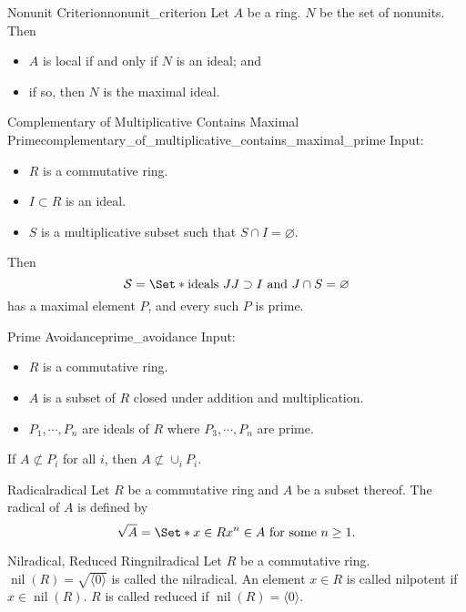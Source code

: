 \documentclass{article}
\begin{document}
\begin{lemma}{Nonunit Criterion}{nonunit_criterion}
    Let $A$ be a ring.
    $N$ be the set of nonunits.
    Then
    \begin{itemize}
        \item $A$ is local if and only if $N$ is an ideal; and
        \item if so, then $N$ is the maximal ideal.
    \end{itemize}
\end{lemma}

\begin{proposition}{Complementary of Multiplicative Contains Maximal Prime}{complementary_of_multiplicative_contains_maximal_prime}
    Input:
    \begin{itemize}
        \item $R$ is a commutative ring.
        \item $I\subset R$ is an ideal.
        \item $S$ is a multiplicative subset such that $S\cap I = \varnothing$.
    \end{itemize}
    Then
    \[ \mathcal{S} = \Set*{\text{ideals } J}{J\supset I \text{ and } J\cap S = \varnothing} \]
    has a maximal element $P$, and every such $P$ is prime.
\end{proposition}

\begin{lemma}{Prime Avoidance}{prime_avoidance}
    Input:
    \begin{itemize}
        \item $R$ is a commutative ring.
        \item $A$ is a subset of $R$ closed under addition and multiplication.
        \item $P_1,\cdots,P_n$ are ideals of $R$ where $P_3,\cdots,P_n$ are prime.
    \end{itemize}
    If $A\not\subset P_i$ for all $i$, then $A\not\subset \cup_i P_i$.
\end{lemma}

\begin{definition}{Radical}{radical}
    Let $R$ be a commutative ring and $A$ be a subset thereof.
    The radical of $A$ is defined by
    \[ \sqrt{A} = \Set*{x\in R}{x^n\in A \text{ for some } n\ge 1}. \]
\end{definition}

\begin{definition}{Nilradical, Reduced Ring}{nilradical}
    Let $R$ be a commutative ring.
    $\operatorname{nil}(R) = \sqrt{\langle 0 \rangle}$ is called the nilradical.
    An element $x\in R$ is called nilpotent if $x\in \operatorname{nil}(R)$.
    $R$ is called reduced if $\operatorname{nil}(R) = \langle 0 \rangle$.
\end{definition}
\end{document}
